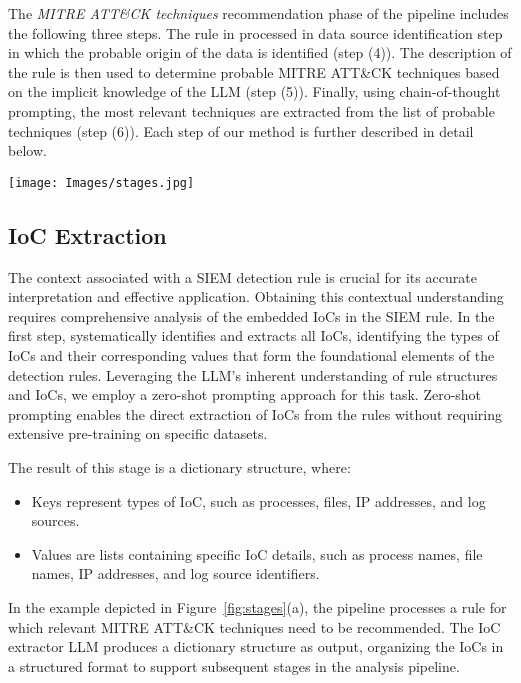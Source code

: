 The \textit{MITRE ATT\&CK techniques} recommendation phase of the pipeline includes the following three steps.
The rule in processed in data source identification step in which the probable origin of the data is identified (step (4)).
The description of the rule is then used to determine probable MITRE ATT\&CK techniques based on the implicit knowledge of the LLM (step (5)).
Finally, using chain-of-thought~\cite{wei2022chain} prompting, the most relevant techniques are extracted from the list of probable techniques (step (6)).
Each step of our method is further described in detail below.


\begin{figure*}[htbp]
   \texttt{[image: Images/stages.jpg]}
    
   \caption{An illustration of the different steps in \methodName.}
   \label{fig:stages}
\end{figure*} 

\subsection{IoC Extraction}
The context associated with a SIEM detection rule is crucial for its accurate interpretation and effective application. 
Obtaining this contextual understanding requires comprehensive analysis of the embedded IoCs in the SIEM rule.
In the first step, \methodName systematically identifies and extracts all IoCs, identifying the types of IoCs and their corresponding values that form the foundational elements of the detection rules. 
Leveraging the LLM's inherent understanding of rule structures and IoCs, we employ a zero-shot prompting approach for this task. 
Zero-shot prompting enables the direct extraction of IoCs from the rules without requiring extensive pre-training on specific datasets.

\noindent The result of this stage is a dictionary structure, where:
\begin{itemize}[nosep,leftmargin=*]
    \item Keys represent types of IoC, such as processes, files, IP addresses, and log sources.
    \item Values are lists containing specific IoC details, such as process names, file names, IP addresses, and log source identifiers.
\end{itemize}

In the example depicted in Figure~\ref{fig:stages}(a), the pipeline processes a rule for which relevant MITRE ATT\&CK techniques need to be recommended. 
The IoC extractor LLM produces a dictionary structure as output, organizing the IoCs in a structured format to support subsequent stages in the analysis pipeline. 



